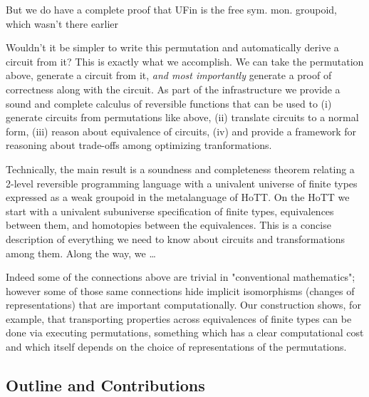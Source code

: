 But we do have a complete proof that UFin is the free sym. mon. groupoid, which wasn't there earlier

Wouldn't it be simpler to write this permutation and automatically derive a circuit from it? This is exactly what we accomplish. We can take the permutation above, generate a circuit from it, \emph{and most importantly} generate a proof of correctness along with the circuit. As part of the infrastructure we provide a sound and complete calculus of reversible functions that can be used to (i) generate circuits from permutations like above, (ii) translate circuits to a normal form, (iii) reason about equivalence of circuits, (iv) and provide a framework for reasoning about trade-offs among optimizing tranformations.

Technically, the main result is a soundness and completeness theorem relating a 2-level reversible programming language with a univalent universe of finite types expressed as a weak groupoid in the metalanguage of HoTT. On the HoTT we start with a univalent subuniverse specification of finite types, equivalences between them, and homotopies between the equivalences. This is a concise description of everything we need to know about circuits and transformations among them. Along the way, we \ldots {}



  Indeed some of the connections above are trivial in "conventional
mathematics"; however some of those same connections hide implicit
isomorphisms (changes of representations) that are important
computationally.  Our construction shows, for example, that
transporting properties across equivalences of finite types can be
done via executing permutations, something which has a clear
computational cost and which itself depends on the choice of
representations of the permutations.

\subsection*{Outline and Contributions}

